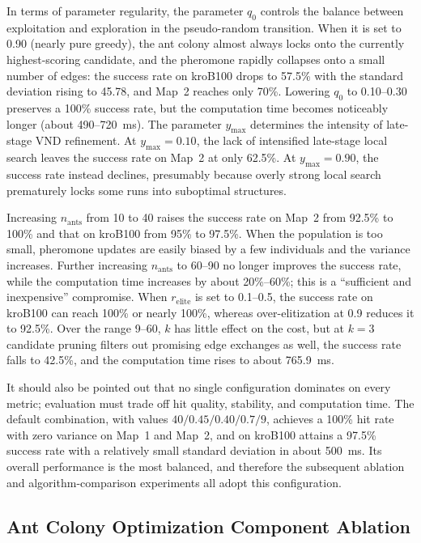 \documentclass[lettersize,journal]{IEEEtran}
\begin{document}
In terms of parameter regularity, the parameter $q_0$ controls the balance between exploitation and exploration in the pseudo-random transition. When it is set to 0.90 (nearly pure greedy), the ant colony almost always locks onto the currently highest-scoring candidate, and the pheromone rapidly collapses onto a small number of edges: the success rate on kroB100 drops to 57.5\% with the standard deviation rising to 45.78, and Map~2 reaches only 70\%. Lowering $q_0$ to 0.10--0.30 preserves a 100\% success rate, but the computation time becomes noticeably longer (about 490--720~ms). The parameter $y_{\max}$ determines the intensity of late-stage VND refinement. At $y_{\max}=0.10$, the lack of intensified late-stage local search leaves the success rate on Map~2 at only 62.5\%. At $y_{\max}=0.90$, the success rate instead declines, presumably because overly strong local search prematurely locks some runs into suboptimal structures.

Increasing $n_{\mathrm{ants}}$ from 10 to 40 raises the success rate on Map~2 from 92.5\% to 100\% and that on kroB100 from 95\% to 97.5\%. When the population is too small, pheromone updates are easily biased by a few individuals and the variance increases. Further increasing $n_{\mathrm{ants}}$ to 60--90 no longer improves the success rate, while the computation time increases by about 20\%--60\%; this is a ``sufficient and inexpensive'' compromise. When $r_{\mathrm{elite}}$ is set to 0.1--0.5, the success rate on kroB100 can reach 100\% or nearly 100\%, whereas over-elitization at 0.9 reduces it to 92.5\%. Over the range 9--60, $k$ has little effect on the cost, but at $k=3$ candidate pruning filters out promising edge exchanges as well, the success rate falls to 42.5\%, and the computation time rises to about 765.9~ms.

It should also be pointed out that no single configuration dominates on every metric; evaluation must trade off hit quality, stability, and computation time. The default combination, with values $40/0.45/0.40/0.7/9$, achieves a 100\% hit rate with zero variance on Map~1 and Map~2, and on kroB100 attains a 97.5\% success rate with a relatively small standard deviation in about 500~ms. Its overall performance is the most balanced, and therefore the subsequent ablation and algorithm-comparison experiments all adopt this configuration.


\subsection{Ant Colony Optimization Component Ablation}
\label{subsec:exp_ablation}
\end{document}
